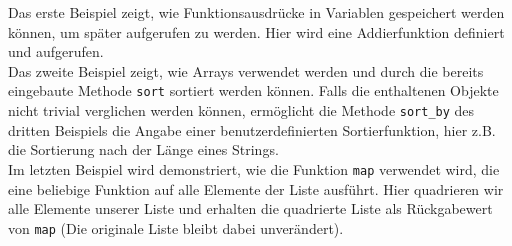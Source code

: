 \begin{ruby}[label=IRB]
         

\PY{o}{[}\PY{o}{]}

\PY{o}{[}      \PY{o}{]}   

   
\end{ruby}
Das erste Beispiel zeigt, wie Funktionsausdrücke in Variablen gespeichert werden können, um später aufgerufen zu werden. Hier wird eine Addierfunktion definiert und aufgerufen.\\
Das zweite Beispiel zeigt, wie Arrays verwendet werden und durch die bereits eingebaute Methode \texttt{sort} sortiert werden können. Falls die enthaltenen Objekte nicht trivial verglichen werden können, ermöglicht die Methode \texttt{sort\_by} des dritten Beispiels die Angabe einer benutzerdefinierten Sortierfunktion, hier z.B. die Sortierung nach der Länge eines Strings.\\
Im letzten Beispiel wird demonstriert, wie die Funktion \texttt{map} verwendet wird, die eine beliebige Funktion auf alle Elemente der Liste ausführt. Hier quadrieren wir alle Elemente unserer Liste und erhalten die quadrierte Liste als Rückgabewert von \texttt{map} (Die originale Liste bleibt dabei unverändert).



